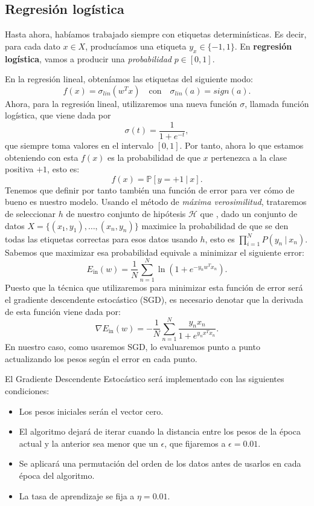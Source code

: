 \documentclass[12pt]{article}
\begin{document}
{\subsection*{Regresión logística}

Hasta ahora, habíamos trabajado siempre con etiquetas determinísticas. Es decir, para cada dato $x\in X$, producíamos una etiqueta $y_x \in \{-1,1\}$. En \textbf{regresión logística}, vamos a producir una \emph{probabilidad} $p \in [0,1]$.

En la regresión lineal, obteníamos las etiquetas del siguiente modo:
$$
f(x) = \sigma_{lin}(w^T x) \quad \text{con} \quad \sigma_{lin}(a) = sign(a).
$$
Ahora, para la regresión lineal, utilizaremos una nueva función $\sigma$, llamada función logística, que viene dada por 
$$
\sigma(t) = \frac{1}{1 + e^{-t}},
$$
que siempre toma valores en el intervalo $[0,1]$. Por tanto, ahora lo que estamos obteniendo con esta $f(x)$ es la probabilidad de que $x$ pertenezca a la clase positiva $+1$, esto es:
$$
f(x) = \mathbb P [ y = +1 \ | \ x].
$$
Tenemos que definir por tanto también una función de error para ver cómo de bueno es nuestro modelo. Usando el método de \emph{máxima verosimilitud}, trataremos de seleccionar $h$ de nuestro conjunto de hipótesis $\mathcal H$ que , dado un conjunto de datos $X = \{(x_1,y_1),\dots,(x_n,y_n)\}$ maximice la probabilidad de que se den todas las etiquetas correctas para esos datos usando $h$, esto es $\prod_{i = 1}^N P(y_n \ | \ x_n)$. Sabemos que maximizar esa probabilidad equivale a minimizar el siguiente error:
\[
E_{\operatorname{in}}(w) = \frac{1}{N} \sum_{n=1}^N \ln \left( 1 + e^{-y_n w^T x_n}\right).  
\]
Puesto que la técnica que utilizaremos para minimizar esta función de error será el gradiente descendente estocástico (SGD), es necesario denotar que la derivada de esta función viene dada por:
\[
\nabla E_{\operatorname{in}}(w) = - \frac{1}{N} \sum_{n = 1}^N \frac{y_n x_n}{ 1 + e^{y_n x^T x_n}}.
\]
En nuestro caso, como usaremos SGD, lo evaluaremos punto a punto actualizando los pesos según el error en cada punto. 

El Gradiente Descendente Estocástico será implementado con las siguientes condiciones:
\begin{itemize}
  \item Los pesos iniciales serán el vector cero.
  \item El algoritmo dejará de iterar cuando la distancia entre los pesos de la época actual y la anterior sea menor que un $\epsilon$, que fijaremos a $\epsilon = 0.01$.
  \item Se aplicará una permutación del orden de los datos antes de usarlos en cada época del algoritmo.
  \item La tasa de aprendizaje se fija a $\eta = 0.01$.
\end{itemize}


}
\end{document}
